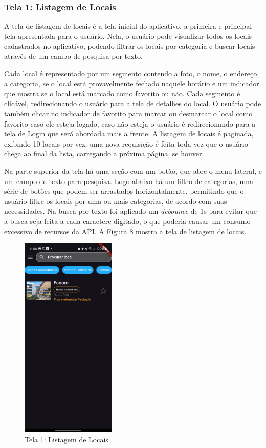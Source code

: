 \subsubsection{Tela 1: Listagem de Locais}

    A tela de listagem de locais é a tela inicial do aplicativo, a primeira e principal tela apresentada para o usuário. Nela, o usuário pode visualizar todos os locais cadastrados no aplicativo, podendo filtrar os locais por categoria e buscar locais através de um campo de pesquisa por texto. 
    
    Cada local é representado por um segmento contendo a foto, o nome, o endereço, a categoria, se o local está provavelmente fechado naquele horário e um indicador que mostra se o local está marcado como favorito ou não. Cada segmento é clicável, redirecionando o usuário para a tela de detalhes do local. O usuário pode também clicar no indicador de favorito para marcar ou desmarcar o local como favorito caso ele esteja logado, caso não esteja o usuário é redirecionando para a tela de Login que será abordada mais a frente. A listagem de locais é paginada, exibindo 10 locais por vez, uma nova requisição é feita toda vez que o usuário chega ao final da lista, carregando a próxima página, se houver.

    Na parte superior da tela há uma seção com um botão, que abre o menu lateral, e um campo de texto para pesquisa. Logo abaixo há um filtro de categorias, uma série de botões que podem ser arrastados horizontalmente, permitindo que o usuário filtre os locais por uma ou mais categorias, de acordo com suas necessidades. Na busca por texto foi aplicado um \textit{debounce} de 1s para evitar que a busca seja feita a cada caractere digitado, o que poderia causar um consumo excessivo de recursos da API. A Figura 8 mostra a tela de listagem de locais.

    \begin{figure}[h]
        \centering
        \includegraphics[width=0.4\textwidth]{imagens/inicial.jpg}
        \caption{\scriptsize Tela 1: Listagem de Locais}
        \label{fig:tela1}
    \end{figure}

